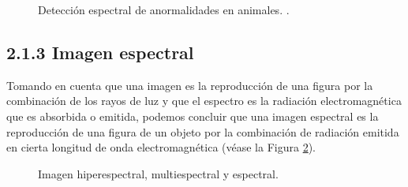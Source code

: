 \begin{figure}[h]
  \centering
  \centering
  \caption{Detección espectral de anormalidades en animales. \cite{animal}.}
  \label{fAnimal}
\end{figure}
\subsection{2.1.3 Imagen espectral}
Tomando en cuenta que una imagen es la reproducción de una figura por la combinación de los rayos de luz y que el espectro es la radiación electromagnética que es absorbida o emitida, podemos concluir que una imagen espectral es la reproducción de una figura de un objeto por la combinación de radiación emitida en cierta longitud de onda electromagnética (véase la Figura \ref{fWiki}).

\begin{figure}[h]
  \centering
  \centering
  \caption{Imagen hiperespectral, multiespectral y espectral.}
  \label{fWiki}
\end{figure}

